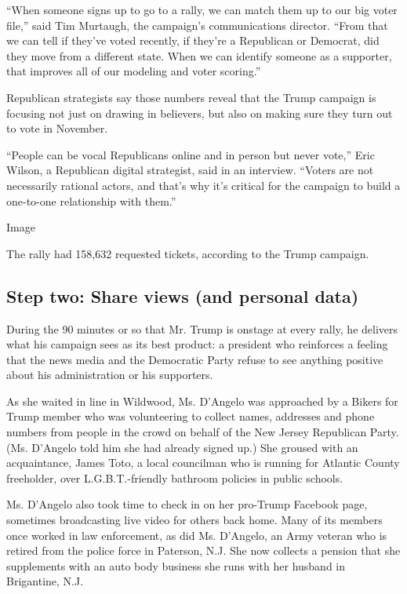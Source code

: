 ``When someone signs up to go to a rally, we can match them up to our
big voter file,'' said Tim Murtaugh, the campaign's communications
director. ``From that we can tell if they've voted recently, if they're
a Republican or Democrat, did they move from a different state. When we
can identify someone as a supporter, that improves all of our modeling
and voter scoring.''

Republican strategists say those numbers reveal that the Trump campaign
is focusing not just on drawing in believers, but also on making sure
they turn out to vote in November.

``People can be vocal Republicans online and in person but never vote,''
Eric Wilson, a Republican digital strategist, said in an interview.
``Voters are not necessarily rational actors, and that's why it's
critical for the campaign to build a one-to-one relationship with
them.''

Image

The rally had 158,632 requested tickets, according to the Trump
campaign.

\hypertarget{step-two-share-views-and-personal-data}{%
\subsection{Step two: Share views (and personal
data)}\label{step-two-share-views-and-personal-data}}

During the 90 minutes or so that Mr. Trump is onstage at every rally, he
delivers what his campaign sees as its best product: a president who
reinforces a feeling that the news media and the Democratic Party refuse
to see anything positive about his administration or his supporters.

As she waited in line in Wildwood, Ms. D'Angelo was approached by a
Bikers for Trump member who was volunteering to collect names, addresses
and phone numbers from people in the crowd on behalf of the New Jersey
Republican Party. (Ms. D'Angelo told him she had already signed up.) She
groused with an acquaintance, James Toto, a local councilman who is
running for Atlantic County freeholder, over L.G.B.T.-friendly bathroom
policies in public schools.

Ms. D'Angelo also took time to check in on her pro-Trump Facebook page,
sometimes broadcasting live video for others back home. Many of its
members once worked in law enforcement, as did Ms. D'Angelo, an Army
veteran who is retired from the police force in Paterson, N.J. She now
collects a pension that she supplements with an auto body business she
runs with her husband in Brigantine, N.J.

